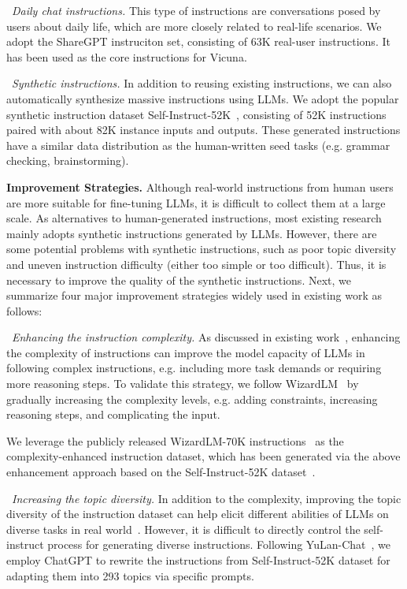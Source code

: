 \textbullet~\emph{Daily chat instructions.} This type of instructions are conversations posed by  users about daily life, which are more closely related to real-life scenarios. We adopt the  ShareGPT instruciton set, consisting of 63K real-user instructions. It has been used as the core instructions for  Vicuna.

\textbullet~\emph{Synthetic instructions.} In addition to reusing existing instructions, we can also automatically synthesize massive instructions using LLMs. We adopt the popular synthetic instruction dataset Self-Instruct-52K~\cite{Wang-arXiv-2022-Self}, consisting of  52K instructions paired with about 82K instance inputs and outputs. These generated instructions have a similar data distribution as the human-written seed tasks (e.g. grammar checking, brainstorming).

\textbf{Improvement Strategies.} Although real-world instructions from human users are more suitable for fine-tuning LLMs, it is difficult to collect them at a large scale. As alternatives to human-generated instructions, most existing research mainly adopts synthetic instructions generated by LLMs. However, there are some potential  problems with synthetic instructions,  such as poor topic diversity and uneven instruction difficulty (either too simple or too difficult). Thus, it is necessary to improve the quality of the synthetic instructions. Next, we summarize four major improvement strategies widely used in existing work as follows:

\textbullet~\emph{Enhancing the instruction complexity.} As discussed in existing work~\cite{Xu-arxiv-2023-WizardLM}, enhancing the complexity of instructions can improve the model capacity of LLMs in following complex instructions, {e.g. including more task demands or requiring more reasoning steps.} To validate this strategy, we follow WizardLM~\cite{Xu-arxiv-2023-WizardLM} by gradually increasing the complexity levels, e.g. adding constraints, increasing reasoning steps, and complicating the input. 

{We leverage the publicly released WizardLM-70K instructions~\cite{Xu-arxiv-2023-WizardLM} as the complexity-enhanced instruction dataset, which has been generated via the above enhancement approach based on the Self-Instruct-52K dataset~\cite{Xu-arxiv-2023-WizardLM}.}

\textbullet~\emph{Increasing the topic diversity.} In addition to the complexity, improving the topic diversity of the instruction dataset {can help elicit different abilities of LLMs on  diverse tasks in real world~\cite{Sun-arxiv-2023-Principle}.} However,  it is difficult to directly control the self-instruct process for generating diverse instructions. Following YuLan-Chat~\cite{YuLan-Chat}, we employ ChatGPT to rewrite the instructions from Self-Instruct-52K dataset for adapting them into 293 topics via specific prompts.

